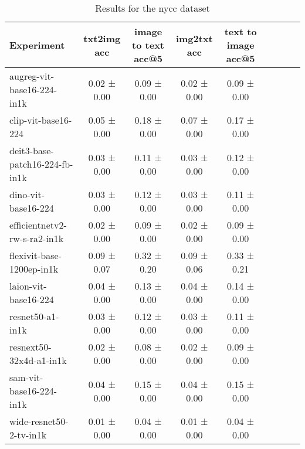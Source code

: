 \begin{table}[htbp]
\caption{Results for the nycc dataset}
\begin{tabular}{|l|c|c|c|c|c|c|c|c|}\hline
Experiment & txt2img acc & image to text acc@5 & img2txt acc & text to image acc@5\\
\hline
augreg-vit-base16-224-in1k & 0.02 ± 0.00 & 0.09 ± 0.00 & 0.02 ± 0.00 & 0.09 ± 0.00\\
\hline
clip-vit-base16-224 & 0.05 ± 0.00 & 0.18 ± 0.00 & 0.07 ± 0.00 & 0.17 ± 0.00\\
\hline
deit3-base-patch16-224-fb-in1k & 0.03 ± 0.00 & 0.11 ± 0.00 & 0.03 ± 0.00 & 0.12 ± 0.00\\
\hline
dino-vit-base16-224 & 0.03 ± 0.00 & 0.12 ± 0.00 & 0.03 ± 0.00 & 0.11 ± 0.00\\
\hline
efficientnetv2-rw-s-ra2-in1k & 0.02 ± 0.00 & 0.09 ± 0.00 & 0.02 ± 0.00 & 0.09 ± 0.00\\
\hline
flexivit-base-1200ep-in1k & 0.09 ± 0.07 & 0.32 ± 0.20 & 0.09 ± 0.06 & 0.33 ± 0.21\\
\hline
laion-vit-base16-224 & 0.04 ± 0.00 & 0.13 ± 0.00 & 0.04 ± 0.00 & 0.14 ± 0.00\\
\hline
resnet50-a1-in1k & 0.03 ± 0.00 & 0.12 ± 0.00 & 0.03 ± 0.00 & 0.11 ± 0.00\\
\hline
resnext50-32x4d-a1-in1k & 0.02 ± 0.00 & 0.08 ± 0.00 & 0.02 ± 0.00 & 0.09 ± 0.00\\
\hline
sam-vit-base16-224-in1k & 0.04 ± 0.00 & 0.15 ± 0.00 & 0.04 ± 0.00 & 0.15 ± 0.00\\
\hline
wide-resnet50-2-tv-in1k & 0.01 ± 0.00 & 0.04 ± 0.00 & 0.01 ± 0.00 & 0.04 ± 0.00\\
\hline
\end{tabular}
\end{table}

